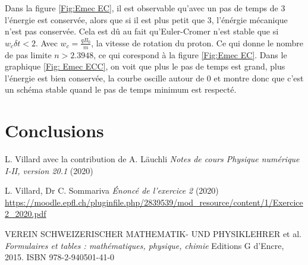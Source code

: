 \documentclass[a4paper,12pt,twoside]{article}
\begin{document}
		Dans la figure \ref{Fig:Emec EC}, il est observable qu'avec un pas de temps de 3 l'\'energie est conserv\'ee, alors que si il est plus petit que 3, l'\'en\'ergie m\'ecanique n'est pas conserv\'ee. Cela est d\^u au fait qu'Euler-Cromer n'est stable que si $w_c \delta t <2$. Avec $w_c = \frac{qB_0}{m}$, la vitesse de rotation du proton. Ce qui donne le nombre de pas limite $n > 2.3948$, ce qui corespond à la figure \ref{Fig:Emec EC}.
		Dans le graphique \ref{Fig: Emec ECC}, on voit que plus le pas de temps est grand, plus l'\'energie est bien conserv\'ee, la courbe oscille autour de 0 et montre donc que c'est un sch\'ema stable quand le pas de temps minimum est respect\'e.
		
	


\section{Conclusions}





\begin{thebibliography}{99}
 L. Villard avec la contribution de A. L\"auchli {\it Notes de cours Physique numérique I-II, version 20.1} (2020)
 
 L. Villard, Dr C. Sommariva {\it \'Enonc\'e de l'exercice 2} (2020)
 \url{https://moodle.epfl.ch/pluginfile.php/2839539/mod_resource/content/1/Exercice2_2020.pdf}
 
 VEREIN SCHWEIZERISCHER MATHEMATIK- UND PHYSIKLEHRER  et al. {\it Formulaires et tables : mathématiques, physique, chimie} Editions G d'Encre, 2015. ISBN 978-2-940501-41-0
 
\end{thebibliography}
\end{document}
